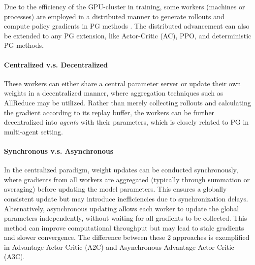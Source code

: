 Due to the efficiency of the GPU-cluster in training, some workers (machines or processes) are employed in a distributed manner to generate rollouts and compute policy gradients in PG methods \cite{brenner2023ppo}. The distributed advancement can also be extended to any PG extension, like Actor-Critic (AC), PPO, and deterministic PG methods.

\paragraph{Centralized v.s. Decentralized} These workers can either share a central parameter server or update their own weights in a decentralized manner, where aggregation techniques such as AllReduce may be utilized. Rather than merely collecting rollouts and calculating the gradient according to its replay buffer, the workers can be further decentralized into \textit{agents} with their parameters, which is closely related to PG in multi-agent setting.

\paragraph{Synchronous v.s. Asynchronous} In the centralized paradigm, weight updates can be conducted synchronously, where gradients from all workers are aggregated (typically through summation or averaging) before updating the model parameters. This ensures a globally consistent update but may introduce inefficiencies due to synchronization delays. Alternatively, asynchronous updating allows each worker to update the global parameters independently, without waiting for all gradients to be collected. This method can improve computational throughput but may lead to stale gradients and slower convergence. The difference between these 2 approaches is exemplified in Advantage Actor-Critic (A2C) and Asynchronous Advantage Actor-Critic (A3C).


